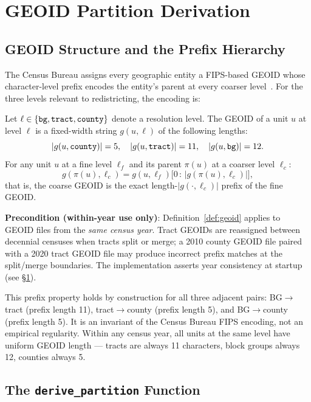 \section{GEOID Partition Derivation}
\label{sec:geoid}

\subsection{GEOID Structure and the Prefix Hierarchy}

The Census Bureau assigns every geographic entity a FIPS-based GEOID
whose character-level prefix encodes the entity's parent at every coarser
level~\citep{census2020geoids}.
For the three levels relevant to redistricting, the encoding is:

\begin{definition}
\label{def:geoid}
Let $\ell \in \{\texttt{bg}, \texttt{tract}, \texttt{county}\}$ denote a resolution level.
The GEOID of a unit $u$ at level $\ell$ is a fixed-width string $g(u, \ell)$
of the following lengths:
\[
  |g(u, \texttt{county})| = 5, \quad
  |g(u, \texttt{tract})| = 11, \quad
  |g(u, \texttt{bg})| = 12.
\]
For any unit $u$ at a fine level $\ell_f$ and its parent $\pi(u)$ at a
coarser level $\ell_c$:
\[
  g(\pi(u), \ell_c) = g(u, \ell_f)\bigl[0 \,:\, |g(\pi(u), \ell_c)|\bigr],
\]
that is, the coarse GEOID is the exact length-$|g(\cdot,\ell_c)|$ prefix
of the fine GEOID.

\textbf{Precondition (within-year use only)}: Definition~\ref{def:geoid} applies
to GEOID files from the \emph{same census year}.
Tract GEOIDs are reassigned between decennial censuses when tracts split or merge;
a 2010 county GEOID file paired with a 2020 tract GEOID file may produce
incorrect prefix matches at the split/merge boundaries.
The implementation asserts year consistency at startup (see \S\ref{sec:geoid}).
\end{definition}

This prefix property holds by construction for all three adjacent pairs:
BG$\to$tract (prefix length 11), tract$\to$county (prefix length 5),
and BG$\to$county (prefix length 5).
It is an invariant of the Census Bureau FIPS encoding, not an empirical
regularity.
Within any census year, all units at the same level have uniform GEOID
length --- tracts are always 11 characters, block groups always 12,
counties always 5.

\subsection{The \texttt{derive\_partition} Function}

